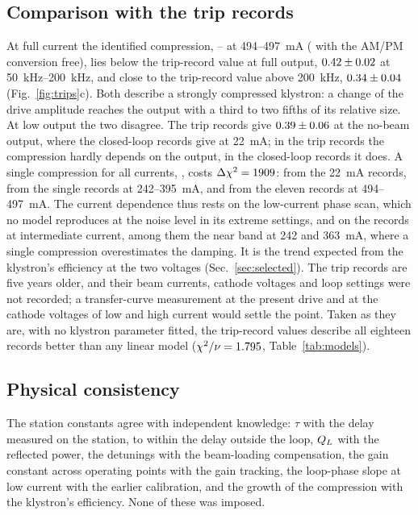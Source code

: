 \subsection{Comparison with the trip records}\label{sec:tripcomp}

At full current the identified compression, \gaSelHighLo--\gaSelHighHi{} at \SI{494}{}--\SI{497}{mA} (\gaFreeHigh{} with the AM/PM conversion free), lies below the trip-record value at full output, $0.42\pm0.02$ at \SIrange{50}{200}{kHz}, and close to the trip-record value above \SI{200}{kHz}, $0.34\pm0.04$ (Fig.~\ref{fig:trips}c). Both describe a strongly compressed klystron: a change of the drive amplitude reaches the output with a third to two fifths of its relative size. At low output the two disagree. The trip records give $0.39\pm0.06$ at the no-beam output, where the closed-loop records give \gaSelLow{} at \SI{22}{mA}; in the trip records the compression hardly depends on the output, in the closed-loop records it does. A single compression for all currents, \gaOneKly, costs $\Delta\chi^2=1909$: \dchiOneLow{} from the \SI{22}{mA} records, \dchiOneMid{} from the single records at 242--\SI{395}{mA}, and \dchiOneHigh{} from the eleven records at 494--\SI{497}{mA}. The current dependence thus rests on the low-current phase scan, which no model reproduces at the noise level in its extreme settings, and on the records at intermediate current, among them the near band at 242 and \SI{363}{mA}, where a single compression overestimates the damping. It is the trend expected from the klystron's efficiency at the two voltages (Sec.~\ref{sec:selected}). The trip records are five years older, and their beam currents, cathode voltages and loop settings were not recorded; a transfer-curve measurement at the present drive and at the cathode voltages of low and high current would settle the point. Taken as they are, with no klystron parameter fitted, the trip-record values describe all eighteen records better than any linear model ($\chi^2/\nu=1.795$, Table~\ref{tab:models}).

\subsection{Physical consistency}

The station constants agree with independent knowledge: $\tau$ with the delay measured on the station, to within the delay outside the loop, $Q_L$ with the reflected power, the detunings with the beam-loading compensation, the gain constant across operating points with the gain tracking, the loop-phase slope at low current with the earlier calibration, and the growth of the compression with the klystron's efficiency. None of these was imposed.

